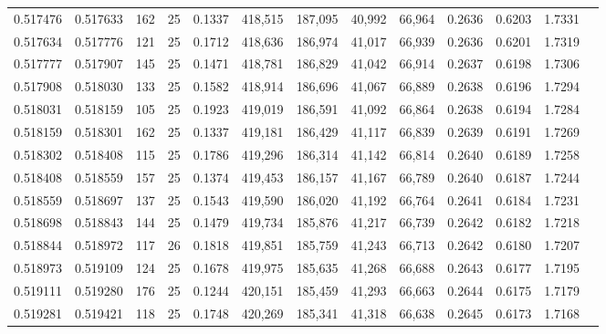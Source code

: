 \begin{tabular}{rrrrrrrrrrrrr}
0.517476 & 0.517633 &   162 &  25 &                                     0.1337 & 418,515 & 187,095 &  40,992 &  66,964 & 0.2636 & 0.6203 & 1.7331 \\
0.517634 & 0.517776 &   121 &  25 &                                     0.1712 & 418,636 & 186,974 &  41,017 &  66,939 & 0.2636 & 0.6201 & 1.7319 \\
0.517777 & 0.517907 &   145 &  25 &                                     0.1471 & 418,781 & 186,829 &  41,042 &  66,914 & 0.2637 & 0.6198 & 1.7306 \\
0.517908 & 0.518030 &   133 &  25 &                                     0.1582 & 418,914 & 186,696 &  41,067 &  66,889 & 0.2638 & 0.6196 & 1.7294 \\
0.518031 & 0.518159 &   105 &  25 &                                     0.1923 & 419,019 & 186,591 &  41,092 &  66,864 & 0.2638 & 0.6194 & 1.7284 \\
0.518159 & 0.518301 &   162 &  25 &                                     0.1337 & 419,181 & 186,429 &  41,117 &  66,839 & 0.2639 & 0.6191 & 1.7269 \\
0.518302 & 0.518408 &   115 &  25 &                                     0.1786 & 419,296 & 186,314 &  41,142 &  66,814 & 0.2640 & 0.6189 & 1.7258 \\
0.518408 & 0.518559 &   157 &  25 &                                     0.1374 & 419,453 & 186,157 &  41,167 &  66,789 & 0.2640 & 0.6187 & 1.7244 \\
0.518559 & 0.518697 &   137 &  25 &                                     0.1543 & 419,590 & 186,020 &  41,192 &  66,764 & 0.2641 & 0.6184 & 1.7231 \\
0.518698 & 0.518843 &   144 &  25 &                                     0.1479 & 419,734 & 185,876 &  41,217 &  66,739 & 0.2642 & 0.6182 & 1.7218 \\
0.518844 & 0.518972 &   117 &  26 &                                     0.1818 & 419,851 & 185,759 &  41,243 &  66,713 & 0.2642 & 0.6180 & 1.7207 \\
0.518973 & 0.519109 &   124 &  25 &                                     0.1678 & 419,975 & 185,635 &  41,268 &  66,688 & 0.2643 & 0.6177 & 1.7195 \\
0.519111 & 0.519280 &   176 &  25 &                                     0.1244 & 420,151 & 185,459 &  41,293 &  66,663 & 0.2644 & 0.6175 & 1.7179 \\
0.519281 & 0.519421 &   118 &  25 &                                     0.1748 & 420,269 & 185,341 &  41,318 &  66,638 & 0.2645 & 0.6173 & 1.7168 \\

\end{tabular}
